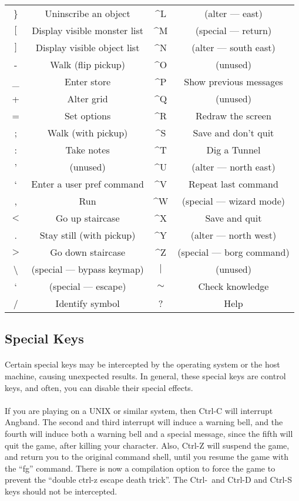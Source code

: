 \begin{tabular}{cc|cc}
\} & Uninscribe an object & \^{}L & (alter --- east)\\
$[$ & Display visible monster list & \^{}M & (special --- return)\\
$]$ & Display visible object list & \^{}N & (alter --- south east)\\
- & Walk (flip pickup) & \^{}O & (unused)\\
\_ & Enter store & \^{}P & Show previous messages\\
+ & Alter grid & \^{}Q & (unused)\\
= & Set options & \^{}R & Redraw the screen\\
; & Walk (with pickup) & \^{}S & Save and don't quit\\
: & Take notes & \^{}T & Dig a Tunnel\\
' & (unused) & \^{}U & (alter --- north east)\\
` &  Enter a user pref command & \^{}V & Repeat last command\\
, & Run & \^{}W & (special --- wizard mode)\\
$<$ & Go up staircase & \^{}X & Save and quit\\
. & Stay still (with pickup) & \^{}Y & (alter --- north west)\\
$>$ & Go down staircase & \^{}Z & (special --- borg command)\\
\textbackslash & (special --- bypass keymap) & $|$ & (unused)\\
` & (special --- escape) & $\sim$ & Check knowledge\\
/ & Identify symbol & ? & Help\\
\end{tabular}

\subsection{Special Keys}
\paragraph{}Certain special keys may be intercepted by the operating system or
the host machine, causing unexpected results. In general, these special keys
are control keys, and often, you can disable their special effects.

\paragraph{}If you are playing on a UNIX or similar system, then Ctrl-C will
interrupt Angband. The second and third interrupt will induce a warning
bell, and the fourth will induce both a warning bell and a special message,
since the fifth will quit the game, after killing your character. Also,
Ctrl-Z will suspend the game, and return you to the original command shell,
until you resume the game with the ``fg'' command. There is now a compilation
option to force the game to prevent the ``double ctrl-z escape death
trick''.
The Ctrl-\ and Ctrl-D and Ctrl-S keys should not be intercepted.
 
